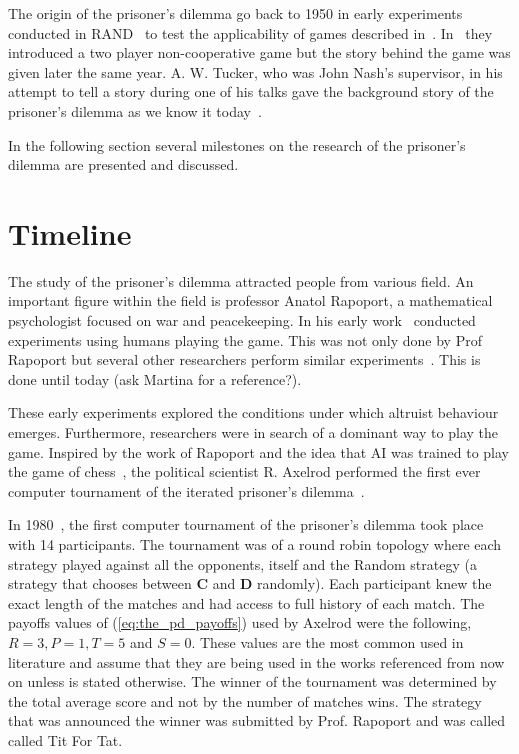 \documentclass{article}
\begin{document}
The origin of the prisoner's dilemma go back to 1950 in early experiments 
conducted in RAND~\cite{Flood1958} to test the applicability of games
described in~\cite{VonNeumann1944}.  In~\cite{Flood1958} they introduced 
a two player non-cooperative game but the story behind the game was
given later the same year. A. W. Tucker, who was John Nash's supervisor, in 
his attempt to tell a story during one of his talks gave the background story of 
the prisoner's dilemma as we know it today~\cite{Tucker1983}. 

In the following section several milestones on the research of the prisoner's
dilemma are presented and discussed. 

\section{Timeline}\label{section:timeline}

The study of the prisoner's dilemma attracted people from various field.
An important figure within the field is professor Anatol Rapoport, a mathematical
psychologist focused on war and peacekeeping.  
In his early work~\cite{rapoport1965} conducted experiments using humans
playing the game. This was not only done by Prof Rapoport but several other
researchers perform similar experiments~\cite{Evans1966, Gallo1968, Lutzker1961,
Mack1971, Sensenig1972}. This is done until today 
(ask Martina for a reference?). %

These early experiments explored the conditions under which 
altruist behaviour emerges. Furthermore, researchers were in search of a 
dominant way to play the game. Inspired by the work of Rapoport and 
the idea that AI was trained to play the game of chess~\cite{axelrod2012}, 
the political scientist R. Axelrod performed the first ever computer tournament 
of the iterated prisoner's dilemma~\cite{Axelrod1981}.

In 1980~\cite{axelrod1980a}, the first computer tournament of the prisoner's 
dilemma took place with 14 participants. The tournament was of a round robin 
topology where each
strategy played against all the opponents, itself and the Random strategy (a 
strategy that chooses between \textbf{C} and \textbf{D} randomly). Each
participant knew the exact length of the matches and had access to full history
of each match.  The payoffs values of (\ref{eq:the_pd_payoffs}) used by Axelrod
were the following, \(R=3, P=1, T=5\) and \(S=0\).  These values are the most 
common used in literature and assume that they are being used in the works 
referenced from now on unless is stated otherwise. The winner of the tournament 
was determined by the total average score and not by the number of matches 
wins. The strategy that was announced the winner was submitted by Prof. 
Rapoport and was called called Tit For Tat.
\end{document}
